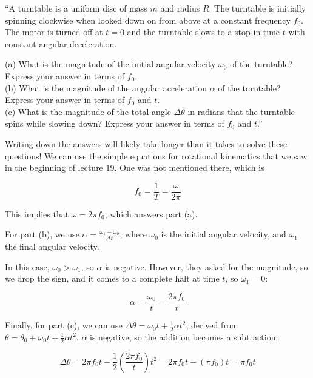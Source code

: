\documentclass[12pt,a4paper]{report}
\begin{document}
``A turntable is a uniform disc of mass $m$ and radius $R$. The turntable is initially spinning clockwise when looked down on from above at a constant frequency $f_0$. The motor is turned off at $t = 0$ and the turntable slows to a stop in time $t$ with constant angular deceleration.

(a) What is the magnitude of the initial angular velocity $\omega_0$ of the turntable? Express your answer in terms of $f_0$.\\
(b) What is the magnitude of the angular acceleration $\alpha$ of the turntable? Express your answer in terms of $f_0$ and $t$.\\
(c) What is the magnitude of the total angle $\Delta \theta$ in radians that the turntable spins while slowing down? Express your answer in terms of $f_0$ and $t$.''

Writing down the answers will likely take longer than it takes to solve these questions! We can use the simple equations for rotational kinematics that we saw in the beginning of lecture 19. One was not mentioned there, which is

\begin{equation}
f_0 = \frac{1}{T} = \frac{\omega}{2 \pi}
\end{equation}

This implies that $\omega = 2 \pi f_0$, which answers part (a).

For part (b), we use $\displaystyle \alpha = \frac{\omega_1 - \omega_0}{\Delta t}$, where $\omega_0$ is the initial angular velocity, and $\omega_1$ the final angular velocity.

In this case, $\omega_0 > \omega_1$, so $\alpha$ is negative. However, they asked for the magnitude, so we drop the sign, and it comes to a complete halt at time $t$, so $\omega_1 = 0$:

\begin{equation}
\alpha = \frac{\omega_0}{t} = \frac{2 \pi f_0}{t}
\end{equation}

Finally, for part (c), we can use $\Delta \theta = \omega_0 t + \frac{1}{2} \alpha t^2$, derived from $\displaystyle \theta = \theta_0 + \omega_0 t + \frac{1}{2} \alpha t^2$. $\alpha$ is negative, so the addition becomes a subtraction:

\begin{equation}
\Delta\theta = 2 \pi f_0 t - \frac{1}{2} \left(\frac{2 \pi f_0}{t}\right) t^2 = 2 \pi f_0 t - \left(\pi f_0\right) t = \pi f_0 t
\end{equation}
\end{document}
